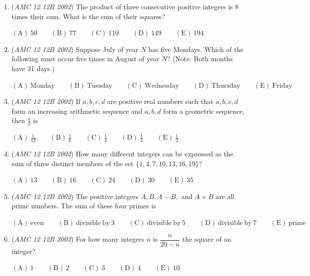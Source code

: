 \begin{enumerate}
 $\mathrm{(A)}\ (-2,1) \qquad\mathrm{(B)}\ (-1,2) \qquad\mathrm{(C)}\ (1,-2) \qquad\mathrm{(D)}\ (2,-1) \qquad\mathrm{(E)}\ (4,4)$


	\item (\textit{AMC 12 12B 2002}) The product of three consecutive positive integers is $8$ times their sum. What is the sum of their squares?


 $\mathrm{(A)}\ 50 \qquad\mathrm{(B)}\ 77 \qquad\mathrm{(C)}\ 110 \qquad\mathrm{(D)}\ 149 \qquad\mathrm{(E)}\ 194$


	\item (\textit{AMC 12 12B 2002}) Suppose July of year $N$ has five Mondays. Which of the following must occur five times in August of year $N$? (Note: Both months have 31 days.)


 $\mathrm{(A)}\ \text{Monday} \qquad\mathrm{(B)}\ \text{Tuesday} \qquad\mathrm{(C)}\ \text{Wednesday} \qquad\mathrm{(D)}\ \text{Thursday} \qquad\mathrm{(E)}\ \text{Friday}$


	\item (\textit{AMC 12 12B 2002}) If $a,b,c,d$ are positive real numbers such that $a,b,c,d$ form an increasing arithmetic sequence and $a,b,d$ form a geometric sequence, then $\frac ad$ is


 $\mathrm{(A)}\ \frac 1{12} \qquad\mathrm{(B)}\ \frac 16 \qquad\mathrm{(C)}\ \frac 14 \qquad\mathrm{(D)}\ \frac 13 \qquad\mathrm{(E)}\ \frac 12$


	\item (\textit{AMC 12 12B 2002}) How many different integers can be expressed as the sum of three distinct members of the set $\{1,4,7,10,13,16,19\}$?


 $\mathrm{(A)}\ 13 \qquad\mathrm{(B)}\ 16 \qquad\mathrm{(C)}\ 24 \qquad\mathrm{(D)}\ 30 \qquad\mathrm{(E)}\ 35$


	\item (\textit{AMC 12 12B 2002}) The positive integers $A, B, A-B,$ and $A+B$ are all prime numbers. The sum of these four primes is


 $\mathrm{(A)}\ \mathrm{even} \qquad\mathrm{(B)}\ \mathrm{divisible\ by\ }3 \qquad\mathrm{(C)}\ \mathrm{divisible\ by\ }5 \qquad\mathrm{(D)}\ \mathrm{divisible\ by\ }7 \qquad\mathrm{(E)}\ \mathrm{prime}$


	\item (\textit{AMC 12 12B 2002}) For how many integers $n$ is $\dfrac n{20-n}$ the square of an integer?


 $\mathrm{(A)}\ 1 \qquad\mathrm{(B)}\ 2 \qquad\mathrm{(C)}\ 3 \qquad\mathrm{(D)}\ 4 \qquad\mathrm{(E)}\ 10$



\end{enumerate}
